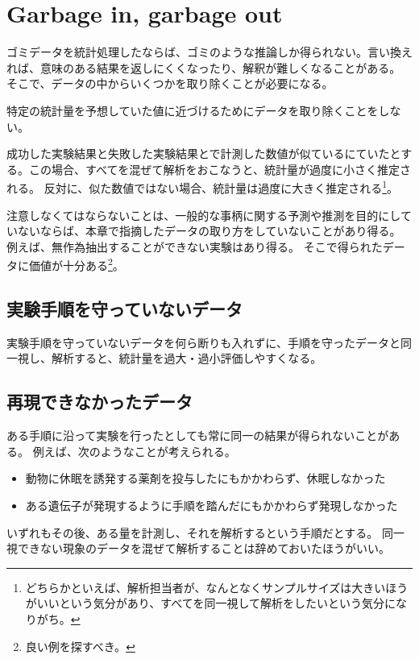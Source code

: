\section{Garbage in, garbage out}
ゴミデータを統計処理したならば、ゴミのような推論しか得られない。言い換えれば、意味のある結果を返しにくくなったり、解釈が難しくなることがある。
そこで、データの中からいくつかを取り除くことが必要になる。

特定の統計量を予想していた値に近づけるためにデータを取り除くことをしない。

成功した実験結果と失敗した実験結果とで計測した数値が似ているにていたとする。この場合、すべてを混ぜて解析をおこなうと、統計量が過度に小さく推定される。
反対に、似た数値ではない場合、統計量は過度に大きく推定される\footnote{どちらかといえば、解析担当者が、なんとなくサンプルサイズは大きいほうがいいという気分があり、すべてを同一視して解析をしたいという気分になりがち。}。

注意しなくてはならないことは、一般的な事柄に関する予測や推測を目的にしていないならば、本章で指摘したデータの取り方をしていないことがあり得る。
例えば、無作為抽出することができない実験はあり得る。
そこで得られたデータに価値が十分ある\footnote{良い例を探すべき。}。%
\fi

\subsection{実験手順を守っていないデータ}
実験手順を守っていないデータを何ら断りも入れずに、手順を守ったデータと同一視し、解析すると、統計量を過大・過小評価しやすくなる。

\subsection{再現できなかったデータ}
ある手順に沿って実験を行ったとしても常に同一の結果が得られないことがある。
例えば、次のようなことが考えられる。
\begin{itemize}
    \item 動物に休眠を誘発する薬剤を投与したにもかかわらず、休眠しなかった
    \item ある遺伝子が発現するように手順を踏んだにもかかわらず発現しなかった
\end{itemize}
いずれもその後、ある量を計測し、それを解析するという手順だとする。
同一視できない現象のデータを混ぜて解析することは辞めておいたほうがいい。


